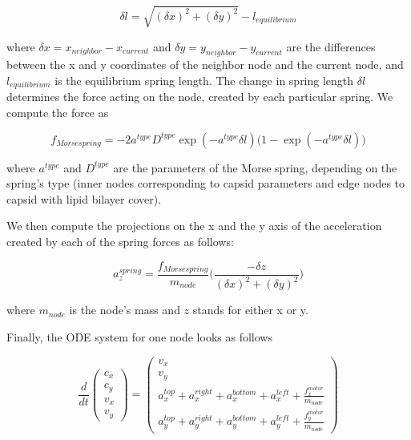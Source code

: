 \begin{equation}
\delta l = \sqrt{(\delta x)^2 + (\delta y)^2} - l_{equilibrium}
\end{equation}

where $\delta x = x_{neighbor} - x_{current}$ and $\delta y = y_{neighbor} - y_{current}$ are the differences between the x and y coordinates of the neighbor node and the current node, and $l_{equilibrium}$ is the equilibrium spring length. The change in spring length $\delta l$ determines the force acting on the node, created by each particular spring. We compute the force as

\begin{equation}
f_{Morse spring} = -2 a^{type} D^{type} \exp(-a^{type} \delta l) \big(1 - \exp(-a^{type} \delta l)\big)
\end{equation}
 
where $a^{type}$ and $D^{type}$ are the parameters of the Morse spring, depending on the spring’s type (inner nodes corresponding to capsid parameters and edge nodes to capsid with lipid bilayer cover).

We then compute the projections on the x and the y axis of the acceleration created by each of the spring forces as follows:

\begin{equation}
a^{spring}_z = \frac{f_{Morse spring}}{m_{node}} \big(\frac{-\delta z}{(\delta x)^2 + (\delta y)^2}\big)
\end{equation}

where $m_{node}$ is the node’s mass and $z$ stands for either x or  y.

Finally, the ODE system for one node looks as follows

\begin{equation}
\frac{d}{dt}
\begin{pmatrix}
c_x\\
c_y\\
v_x\\
v_y
\end{pmatrix}
=
\begin{pmatrix}
v_x\\
v_y\\
a^{top}_x + a^{right}_x + a^{bottom}_x + a^{left}_x + \frac{f^{motor}_x}{m_{node}}\\
a^{top}_y + a^{right}_y + a^{bottom}_y + a^{left}_y + \frac{f^{motor}_y}{m_{node}}
\end{pmatrix}
\end{equation}


